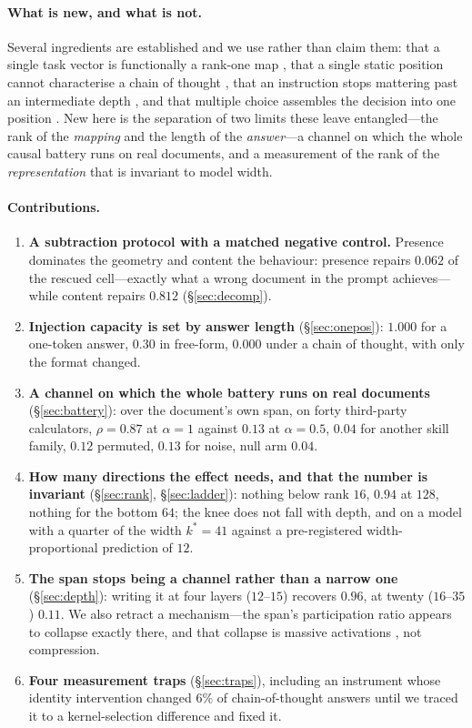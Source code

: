 \documentclass{article}
\begin{document}
\paragraph{What is new, and what is not.} Several ingredients are established
and we use rather than claim them: that a single task vector is functionally a
rank-one map \citep{dong2026taskvectorlimits}, that a single static position
cannot characterise a chain of thought \citep{dura2026sequentialpatching}, that
an instruction stops mattering past an intermediate depth
\citep{onset2025instruction}, and that multiple choice assembles the decision
into one position \citep{wiegreffe2025mcq}. New here is the separation of two
limits these leave entangled---the rank of the \emph{mapping} and the length of
the \emph{answer}---a channel on which the whole causal battery runs on real
documents, and a measurement of the rank of the \emph{representation} that is
invariant to model width.

\paragraph{Contributions.}
\begin{enumerate}\itemsep0pt\parskip0pt
\item \textbf{A subtraction protocol with a matched negative control.} Presence
dominates the geometry and content the behaviour: presence repairs $0.062$ of
the rescued cell---exactly what a wrong document in the prompt achieves---while
content repairs $0.812$ (\S\ref{sec:decomp}).
\item \textbf{Injection capacity is set by answer length} (\S\ref{sec:onepos}):
$1.000$ for a one-token answer, $0.30$ in free-form, $0.000$ under a chain of
thought, with only the format changed.
\item \textbf{A channel on which the whole battery runs on real documents}
(\S\ref{sec:battery}): over the document's own span, on forty third-party
calculators, $\rho = 0.87$ at $\alpha=1$ against $0.13$ at $\alpha=0.5$, $0.04$
for another skill family, $0.12$ permuted, $0.13$ for noise, null arm $0.04$.
\item \textbf{How many directions the effect needs, and that the number is
invariant} (\S\ref{sec:rank}, \S\ref{sec:ladder}): nothing below rank $16$,
$0.94$ at $128$, nothing for the bottom $64$; the knee does not fall with depth,
and on a model with a quarter of the width $k^{*}=41$ against a pre-registered
width-proportional prediction of $12$.
\item \textbf{The span stops being a channel rather than a narrow one}
(\S\ref{sec:depth}): writing it at four layers ($12$--$15$) recovers $0.96$, at
twenty ($16$--$35$) $0.11$. We also retract a mechanism---the span's
participation ratio appears to collapse exactly there, and that collapse is
massive activations \citep{sun2024massive}, not compression.
\item \textbf{Four measurement traps} (\S\ref{sec:traps}), including an
instrument whose identity intervention changed $6\%$ of chain-of-thought answers
until we traced it to a kernel-selection difference and fixed it.
\end{enumerate}
\end{document}
